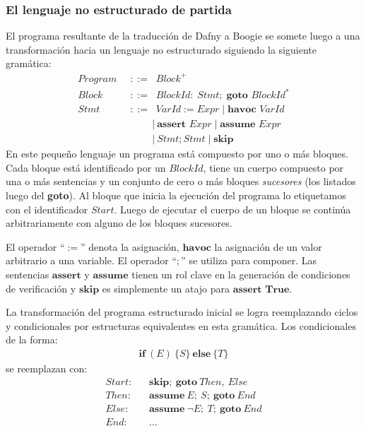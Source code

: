 \documentclass[12pt, a4paper, openany, fleqn]{book}
\begin{document}
    \subsubsection*{El lenguaje no estructurado de partida}
    El programa resultante de la traducción de Dafny a Boogie se somete luego a una transformación hacia un lenguaje no estructurado siguiendo la siguiente gramática:
    \begin{align*}
        Program \;\;&::=\;\; Block^{+} \\
          Block \;\;&::=\;\; BlockId :\; Stmt;\;\textbf{goto } BlockId^{*} \\
           Stmt \;\;&::=\;\; VarId := Expr\;|\;\textbf{havoc } VarId \\
                &\;\;\;\;\;\;\;\;|\ \textbf{assert } Expr\;|\;\textbf{assume } Expr \\
                &\;\;\;\;\;\;\;\;|\ Stmt ; Stmt \;|\; \textbf{skip}
    \end{align*}
    En este pequeño lenguaje un programa está compuesto por uno o más bloques. Cada bloque está identificado por un $BlockId$, tiene un cuerpo compuesto por una o más sentencias y un conjunto de cero o más bloques \textit{sucesores} (los listados luego del \textbf{goto}). Al bloque que inicia la ejecución del programa lo etiquetamos con el identificador $Start$. Luego de ejecutar el cuerpo de un bloque se continúa arbitrariamente con alguno de los bloques sucesores.

    El operador ``$:=$'' denota la asignación, $\textbf{havoc}$ la asignación de un valor arbitrario a una variable. El operador ``$;$'' se utiliza para componer. Las sentencias $\textbf{assert}$ y $\textbf{assume}$ tienen un rol clave en la generación de condiciones de verificación y $\textbf{skip}$ es simplemente un atajo para $\textbf{assert True}$.

    La transformación del programa estructurado inicial se logra reemplazando ciclos y condicionales por estructuras equivalentes en esta gramática. Los condicionales de la forma:
    \begin{align*}
        \textbf{if}\ (E)\ \{S\}\ \textbf{else}\ \{T\}
    \end{align*}
    se reemplazan con:
    \begin{align*}
        Start:&\;\;\;\textbf{skip};\ \textbf{goto}\ Then,\ Else \\
        Then:&\;\;\;\textbf{assume}\ E;\ S;\ \textbf{goto}\ End \\
        Else:&\;\;\;\textbf{assume}\ \lnot E;\ T;\ \textbf{goto}\ End \\
        End:&\;\;\;...
    \end{align*}
\end{document}
